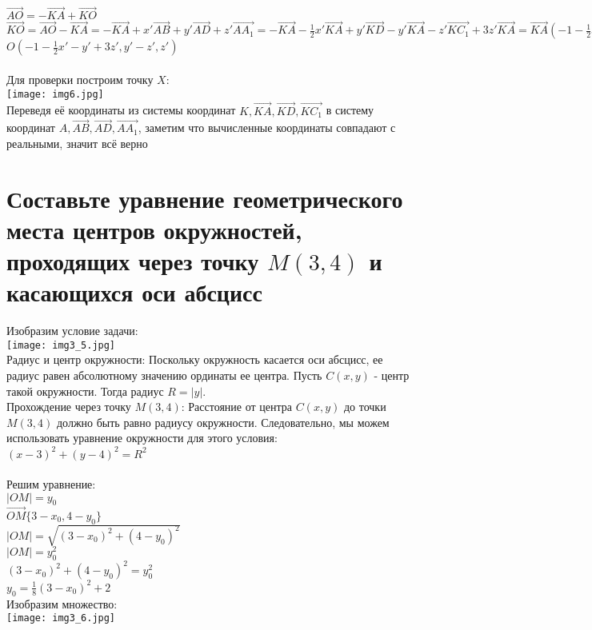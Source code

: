 \documentclass{article}
\begin{document}
    $\overrightarrow{AO} = -\overrightarrow{KA} + \overrightarrow{KO}$ \\
    $\overrightarrow{KO} = \overrightarrow{AO} - \overrightarrow{KA} = -\overrightarrow{KA} + x' \overrightarrow{AB} + y' \overrightarrow{AD} + z' \overrightarrow{AA_1} = -\overrightarrow{KA} - \frac{1}{2} x' \overrightarrow{KA} + y' \overrightarrow{KD} - y' \overrightarrow{KA} - z' \overrightarrow{KC_1} + 3z' \overrightarrow{KA} = \overrightarrow{KA} (-1 - \frac{1}{2}x' - y' + 3z') + (y'-z') \overrightarrow{KD} + z' \overrightarrow{KC_1}$ \\
    $O(-1 - \frac{1}{2}x' - y' + 3z', y'-z', z')$ \\ \\
    Для проверки построим точку $X$: \\
    \texttt{[image: img6.jpg]} \\
    Переведя её координаты из системы координат $K, \overrightarrow{KA}, \overrightarrow{KD}, \overrightarrow{KC_1}$ в систему координат $A, \overrightarrow{AB}, \overrightarrow{AD}, \overrightarrow{AA_1}$, заметим что вычисленные координаты совпадают с реальными, значит всё верно

\newpage
\section{Составьте уравнение геометрического места центров окружностей, проходящих
через точку $M(3,4)$ и касающихся оси абсцисс}
    Изобразим условие задачи: \\
    \texttt{[image: img3\_5.jpg]} \\
    Радиус и центр окружности: Поскольку окружность касается оси абсцисс, ее радиус равен абсолютному значению ординаты ее центра. Пусть $C(x,y)$ - центр такой окружности. Тогда радиус $R=|y|$. \\
    Прохождение через точку $M(3,4)$: Расстояние от центра $C(x,y)$ до точки $M(3,4)$ должно быть равно радиусу окружности. Следовательно, мы можем использовать уравнение окружности для этого условия:
    $(x - 3)^2 + (y - 4)^2=R^2$ \\ \\
    Решим уравнение: \\
    $|OM| = y_0$ \\
    $\overrightarrow{OM} \{3-x_0, 4 - y_0\}$ \\
    $|OM| = \sqrt{(3 - x_0)^2 + (4 - y_0)^2}$ \\
    $|OM| = y_0^2$ \\
    $(3 - x_0)^2 + (4 - y_0)^2 = y_0^2$ \\
    $y_0 = \frac{1}{8}(3 - x_0)^2 + 2$ \\
    Изобразим множество: \\
    \texttt{[image: img3\_6.jpg]}
    
\end{document}
